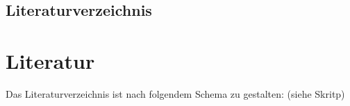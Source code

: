 \documentclass[11pt,captions=tableheading]{scrartcl}
\begin{document}

\setcounter{page}{1}
\tableofcontents
\setcounter{tocdepth}{3}
\clearscrheadfoot
\pagestyle{scrheadings}
\cfoot[]{} 
\ofoot[\pagemark]{\pagemark}
\newpage
{}
\setcounter{page}{1}








\begin{spacing}{0.05}
\thispagestyle{plain}
\section{Literaturverzeichnis}
\pagestyle{scrheadings}
\printbibliography
\end{spacing}

\section{Literatur}
Das Literaturverzeichnis ist nach folgendem Schema zu gestalten: (siehe Skritp)\\



\end{document}
